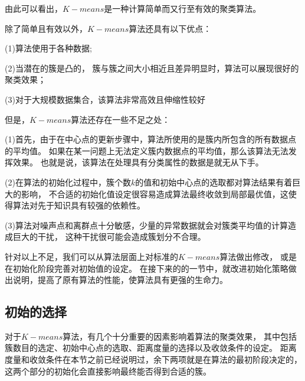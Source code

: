 \documentclass[bachelor,adobefonts]{jnuthesis}
\begin{document}
由此可以看出，$K-means$是一种计算简单而又行至有效的聚类算法。

除了简单且有效以外，$K-means$算法还具有以下优点：

(1)算法使用于各种数据;

(2)当潜在的簇是凸的，
簇与簇之间大小相近且差异明显时，算法可以展现很好的聚类效果；

(3)对于大规模数据集合，该算法非常高效且伸缩性较好

但是，$K-means$算法还存在一些不足之处：

(1)首先，由于在中心点的更新步骤中，算法所使用的是簇内所包含的所有数据点的平均值。
如果在某一问题上无法定义簇内数据点的平均值，那么该算法无法发挥效果。
也就是说，该算法在处理具有分类属性的数据是就无从下手。

(2)在算法的初始化过程中，簇个数$k$的值和初始中心点的选取都对算法结果有着巨大的影响，
不合适的初始化值设定很容易造成算法最终收敛到局部最优值，这使得算法对先于知识具有较强的依赖性。

(3)算法对噪声点和离群点十分敏感，少量的异常数据就会对簇类平均值的计算造成巨大的干扰，
这种干扰很可能会造成簇划分不合理。

针对以上不足，我们可以从算法层面上对标准的$K-means$算法做出修改，
或是在初始化阶段完善对初始值的设定。
在接下来的的一节中，就改进初始化策略做出说明，提高了原有算法的性能，使算法具有更强的生命力。


\subsection{初始的选择}
对于$K-means$算法，有几个十分重要的因素影响着算法的聚类效果，
其中包括簇数目的选定、初始中心点的选取、距离度量的选择以及收敛条件的设定。
距离度量和收敛条件在本节之前已经说明过，余下两项就是在算法的最初阶段决定的，
这两个部分的初始化会直接影响最终能否得到合适的簇。
\end{document}
